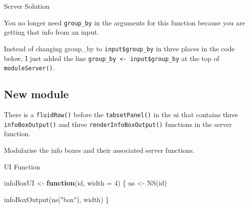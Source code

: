 \documentclass[
  oneside]{book}
\newenvironment{Shaded}{\begin{snugshade}}{\end{snugshade}}
\newcommand{\AttributeTok}[1]{\textcolor[rgb]{0.77,0.63,0.00}{#1}}
\newcommand{\CommentTok}[1]{\textcolor[rgb]{0.56,0.35,0.01}{\textit{#1}}}
\newcommand{\ControlFlowTok}[1]{\textcolor[rgb]{0.13,0.29,0.53}{\textbf{#1}}}
\newcommand{\DecValTok}[1]{\textcolor[rgb]{0.00,0.00,0.81}{#1}}
\newcommand{\FunctionTok}[1]{\textcolor[rgb]{0.00,0.00,0.00}{#1}}
\newcommand{\NormalTok}[1]{#1}
\newcommand{\OtherTok}[1]{\textcolor[rgb]{0.56,0.35,0.01}{#1}}
\newcommand{\SpecialCharTok}[1]{\textcolor[rgb]{0.00,0.00,0.00}{#1}}
\newcommand{\StringTok}[1]{\textcolor[rgb]{0.31,0.60,0.02}{#1}}
\begin{document}
Server Solution

You no longer need \texttt{group\_by} in the arguments for this function because you are getting that info from an input.

Instead of changing \AttributeTok{group\_by} to \texttt{input\$group\_by} in three places in the code below, I just added the line \texttt{group\_by\ \textless{}-\ input\$group\_by} at the top of \texttt{moduleServer}\texttt{()}.

\begin{Shaded}
\end{Shaded}

\hypertarget{new-module}{%
\subsection*{New module}\label{new-module}}

There is a \texttt{fluidRow}\texttt{()} before the \texttt{tabsetPanel}\texttt{()} in the ui that contains three \texttt{infoBoxOutput}\texttt{()} and three \texttt{renderInfoBoxOutput}\texttt{()} functions in the server function.

Modularise the info boxes and their associated server functions.

UI Function

\begin{Shaded}
\begin{Highlighting}[]
\NormalTok{infoBoxUI }\OtherTok{\textless{}{-}} \ControlFlowTok{function}\NormalTok{(id, }\AttributeTok{width =} \DecValTok{4}\NormalTok{) \{}
\NormalTok{    ns }\OtherTok{\textless{}{-}} \FunctionTok{NS}\NormalTok{(id)}

    \FunctionTok{infoBoxOutput}\NormalTok{(}\FunctionTok{ns}\NormalTok{(}\StringTok{"box"}\NormalTok{), width)}
\NormalTok{\}}
\end{Highlighting}
\end{Shaded}
\end{document}
